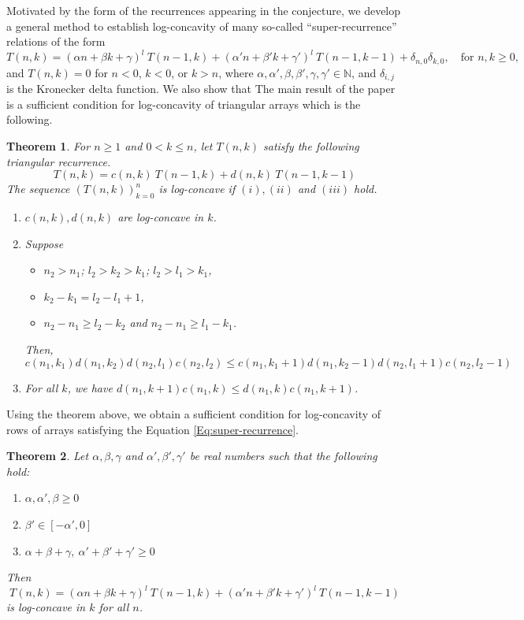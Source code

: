 \documentclass{article}
\newcommand{\N}{\mathbb{N}}
\newtheorem{theorem}{Theorem}[section]
\theoremstyle{definition}
\numberwithin{equation}{section}
\begin{document}
Motivated by the form of the recurrences appearing in the conjecture, we develop a general method to establish log-concavity of many so-called ``super-recurrence'' relations of the form
\begin{equation}\label{Eq:super-recurrence}
    T(n,k)=(\alpha n+\beta k +\gamma)^l\ T(n-1,k) + (\alpha'n+\beta'k+\gamma')^l\ T(n-1,k-1) + \delta_{n,0}\delta_{k,0}, \quad \text{for } n, k \geq 0,
\end{equation}
and $T(n,k) = 0$ for $n < 0$, $k < 0$, or $k > n$, where $\alpha,\alpha',\beta,\beta',\gamma,\gamma' \in \N$, and $\delta_{i,j}$ is the Kronecker delta function. We also show that 
The main result of the paper is a sufficient condition for log-concavity of triangular arrays which is the following.
\begin{theorem}\label{thm: main}
     For $n\ge 1$ and $0<k \le n$, let $T(n,k)$ satisfy the following triangular recurrence.
    \begin{equation*}
        T(n,k)=c(n,k)\ T(n-1,k)+d(n,k)\ T(n-1,k-1)
    \end{equation*}
    The sequence $(T(n,k))_{k=0}^n$ is log-concave if $(i),(ii)$ and $(iii)$ hold.
    \begin{enumerate}
        \item $c(n,k),d(n,k)$ are log-concave in $k$.
        \item  Suppose \begin{itemize}
     \item $n_2>n_1$; $l_2>k_2>k_1$; $l_2>l_1>k_1$,
     \item $k_2-k_1=l_2-l_1+1$,
     \item $n_2-n_1\ge l_2-k_2$ and $n_2-n_1\ge l_1-k_1$.
\end{itemize} Then,
$$c(n_1,k_1)d(n_1,k_2)d(n_2,l_1)c(n_2,l_2)\le c(n_1,k_1+1)d(n_1,k_2-1)d(n_2,l_1+1)c(n_2,l_2-1)$$ 
        \item For all $k$, we have $d(n_1,k+1)c(n_1,k)\le d(n_1,k)c(n_1,k+1)$.
    \end{enumerate}
 \end{theorem}

Using the theorem above, we obtain a sufficient condition for log-concavity of rows of arrays satisfying the Equation \eqref{Eq:super-recurrence}. 

\begin{theorem}\label{thm: a,b,c}
    Let $\alpha,\beta,\gamma$ and $\alpha',\beta',\gamma'$ be real numbers such that the following hold:
    \begin{enumerate}
        \item $\alpha, \alpha',\beta\ge 0$
        \item $\beta'\in [-\alpha',0]$
        \item $\alpha+\beta+\gamma,\ \alpha'+\beta'+\gamma'\ge 0$
    \end{enumerate}
    Then \begin{equation}
        T(n,k)=(\alpha n+\beta k+\gamma)^l\ T(n-1,k)+(\alpha'n+\beta'k+\gamma')^l \ T(n-1,k-1)
    \end{equation}
    is log-concave in $k$ for all $n$.
\end{theorem}
\end{document}
